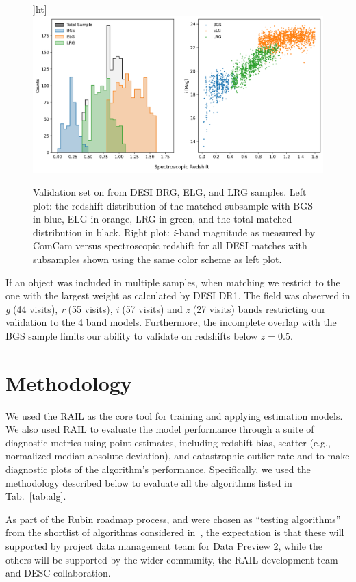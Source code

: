 \begin{figure}]ht]
    \centering
    \includegraphics[width=.8\linewidth]{figures/desi_sample_histogram.png}
    \caption{Validation set on  from DESI BRG, ELG, and LRG samples. Left plot: the redshift distribution of the matched subsample with BGS in blue, ELG in orange, LRG in green, and the total matched distribution in black. Right plot: \textit{i}-band magnitude as measured by ComCam versus spectroscopic redshift for all DESI matches with subsamples shown using the same color scheme as left plot.}
    \label{fig:desi-subsample-hist}
\end{figure}

If an object was included in multiple samples, when matching we restrict to the one with the largest weight as calculated by DESI DR1.
The  field was observed in \textit{g} (44 visits), \textit{r} (55 visits), \textit{i} (57 visits) and \textit{z} (27 visits) bands restricting our validation to the 4 band models.
Furthermore, the incomplete overlap with the BGS sample limits our ability to validate on redshifts below $z=0.5$. 


\section{Methodology}
\label{sec:method:0}

We used the RAIL as the core tool for training and applying \photoz estimation models.   We also used RAIL to evaluate the model performance through a suite of diagnostic metrics using \photoz point estimates, including redshift bias, scatter (e.g., normalized median absolute deviation), and catastrophic outlier rate and to make diagnostic plots of the algorithm's performance.  Specifically, we used the methodology described below to evaluate all the algorithms listed in Tab.~\ref{tab:alg}.

As part of the Rubin \photoz roadmap process,  and  were chosen as ``testing algorithms'' from the shortlist of algorithms considered in~\citep{DMTN:049}, the expectation is that these will supported by project data management team for Data Preview 2,  while the others will be supported by the wider community, the RAIL development team and DESC collaboration.


